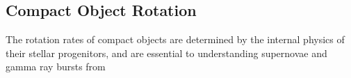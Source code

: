 {\color{orange}

\subsection{Compact Object Rotation}

The rotation rates of compact objects are determined by the internal physics of their stellar progenitors, and are essential to understanding supernovae and gamma ray bursts from 

}
